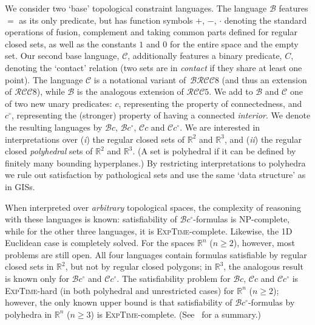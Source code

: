 \documentclass{article}
\newcommand{\ic}{c^\circ}
\newcommand{\NP}{\textsc{NP}}
\newcommand{\ExpTime}{\textsc{ExpTime}}
\newcommand{\cB}{\mathcal{B}}\newcommand{\cBC}{\mathcal{C}}\newcommand{\cBc}{\ensuremath{\mathcal{B}c}}
\newcommand{\cBci}{\ensuremath{\mathcal{B}c^\circ}}
\newcommand{\RCCE}{\ensuremath{\mathcal{RCC}8}}\newcommand{\RCCF}{\ensuremath{\mathcal{RCC}5}}\newcommand{\BRCCE}{\ensuremath{\mathcal{BRCC}8}}\newcommand{\RCCEc}{\ensuremath{\RCCE{}c}}\newcommand{\RCCEci}{\ensuremath{\RCCE{}c^\circ}}\newcommand{\cBCc}{\ensuremath{\mathcal{C}c}}\newcommand{\cBCci}{\ensuremath{\mathcal{C}c^\circ}}
\newcommand{\R}{\mathbb{R}}
\begin{document}
We consider two `base' topological
constraint languages.  The language $\cB$ features $=$ as its
only predicate, but has function symbols $+$, $-$, $\cdot$ denoting
the standard operations of fusion, complement and taking common parts
defined for regular closed sets, as well as the constants $1$ and $0$
for the entire space and the empty set. Our second base language,
$\cBC$, additionally features a binary predicate, $C$, denoting the
`contact' relation (two sets are in {\em contact} if they share at
least one point).  The language $\cBC$ is a notational variant
of~\BRCCE{} (and thus an extension of \RCCE), while $\cB$ is the
analogous extension of \RCCF{}. We add to $\cB$ and $\cBC$ one of
two new unary predicates: $c$, representing the property of
connectedness, and $\ic$, representing the (stronger) property of
having a connected \emph{interior}. We denote the resulting languages
by $\cBc$, $\cBci$\!, $\cBCc$ and $\cBCci$\!. We are interested 
in interpretations over ({\em i}) the regular closed sets of $\R^2$
and $\R^3$, and ({\em ii}) the regular closed \emph{polyhedral} sets
of $\R^2$ and $\R^3$.  (A set is polyhedral if it can be defined by
finitely many bounding hyperplanes.) By restricting interpretations to
polyhedra we rule out satisfaction by pathological sets and use the
same `data structure' as in GISs.

When interpreted over {\em arbitrary} topological spaces, the
complexity of reasoning with these languages is known: satisfiability
of $\cBci$-formulas is \NP-complete, while for the other three
languages, it is \ExpTime-complete.  Likewise, the 1D Euclidean case
is completely solved.  For the spaces $\R^n$ ($n \geq 2$), however,
most problems are still open.  All four languages contain
formulas satisfiable by regular closed sets in $\R^2$, but not by
regular closed polygons; in $\R^3$, the analogous result is known
only for $\cBci$ and $\cBCci$. The satisfiability problem for \cBc{},
\cBCc{} and \cBCci{} is \ExpTime-hard (in both polyhedral and
unrestricted cases) for $\R^n$ ($n \geq 2$); however, the only known
upper bound is that satisfiability of $\cBci$-formulas by
polyhedra in $\R^n$ ($n \geq 3$) is \ExpTime-complete.
(See~\cite{ijcai:kphz10} for a summary.)
\end{document}
